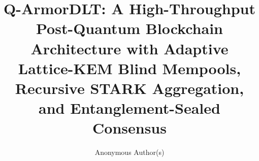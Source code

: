 \documentclass[runningheads]{llncs}
\begin{document}
\title{Q-ArmorDLT: A High-Throughput Post-Quantum Blockchain Architecture with Adaptive Lattice-KEM Blind Mempools, Recursive STARK Aggregation, and Entanglement-Sealed Consensus}


\author{Anonymous Author(s)}



\maketitle
\end{document}
